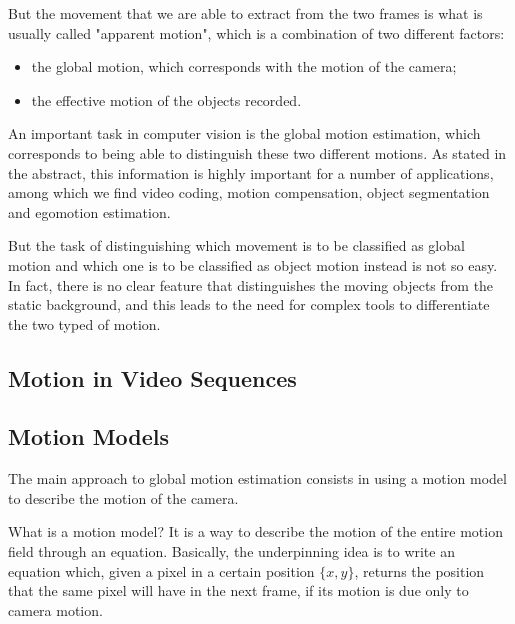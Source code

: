 But the movement that we are able to extract from the two frames is what is usually called "apparent motion", which is a combination of two different factors:
\begin{itemize}[noitemsep]
    \item the global motion, which corresponds with the motion of the camera;
    \item the effective motion of the objects recorded.
\end{itemize}

An important task in computer vision is the global motion estimation, which corresponds to being able to distinguish these two different motions.
As stated in the abstract, this information is highly important for a number of applications, among which we find video coding, motion compensation, object segmentation and egomotion estimation.

But the task of distinguishing which movement is to be classified as global motion and which one is to be classified as object motion instead is not so easy. In fact, there is no clear feature that distinguishes the moving objects from the static background, and this leads to the need for complex tools to differentiate the two typed of motion.

\subsection{Motion in Video Sequences}


\subsection{Motion Models}
\label{sec:motion-models}

The main approach to global motion estimation consists in using a motion model to describe the motion of the camera.

What is a motion model?
It is a way to describe the motion of the entire motion field through an equation. Basically, the underpinning idea is to write an equation which, given a pixel in a certain position $\{x,y\}$, returns the position that the same pixel will have in the next frame, if its motion is due only to camera motion.


